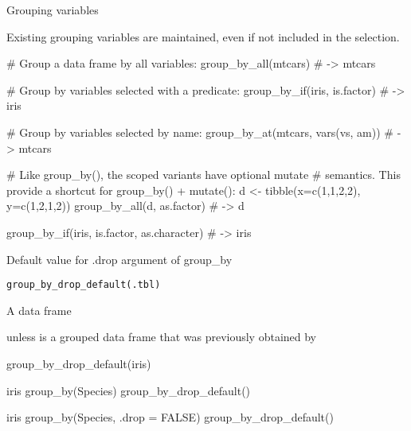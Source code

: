 \documentclass[a4paper]{book}
\begin{document}
%
\begin{Section}{Grouping variables}


Existing grouping variables are maintained, even if not included in
the selection.
\end{Section}
%
\begin{Examples}
\begin{ExampleCode}
# Group a data frame by all variables:
group_by_all(mtcars)
# ->
mtcars %

# Group by variables selected with a predicate:
group_by_if(iris, is.factor)
# ->
iris %

# Group by variables selected by name:
group_by_at(mtcars, vars(vs, am))
# ->
mtcars %

# Like group_by(), the scoped variants have optional mutate
# semantics. This provide a shortcut for group_by() + mutate():
d <- tibble(x=c(1,1,2,2), y=c(1,2,1,2))
group_by_all(d, as.factor)
# ->
d %

group_by_if(iris, is.factor, as.character)
# ->
iris %
\end{ExampleCode}
\end{Examples}
%
\begin{Description}
Default value for .drop argument of group\_by
\end{Description}
%
\begin{Usage}
\begin{verbatim}
group_by_drop_default(.tbl)
\end{verbatim}
\end{Usage}
%
\begin{Arguments}
\begin{ldescription}
\item[\code{.tbl}] A data frame
\end{ldescription}
\end{Arguments}
%
\begin{Value}
 unless  is a grouped data frame that was previously
obtained by 
\end{Value}
%
\begin{Examples}
\begin{ExampleCode}
group_by_drop_default(iris)

iris %
  group_by(Species) %
  group_by_drop_default()

iris %
  group_by(Species, .drop = FALSE) %
  group_by_drop_default()

\end{ExampleCode}
\end{Examples}
\end{document}
